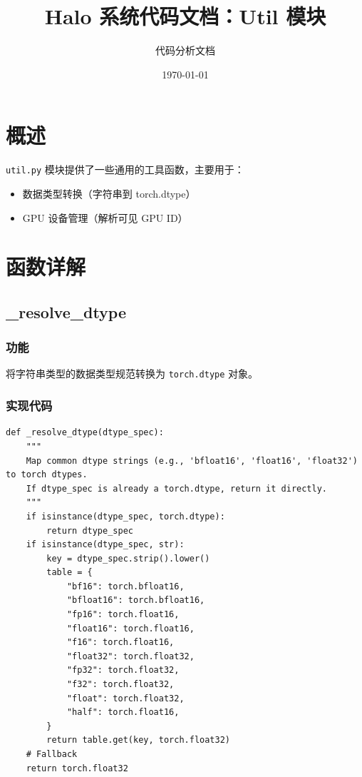 \documentclass[12pt,a4paper]{article}
\title{Halo 系统代码文档：Util 模块}
\author{代码分析文档}
\date{\today}
\begin{document}
\maketitle

\tableofcontents
\newpage

\section{概述}

\texttt{util.py} 模块提供了一些通用的工具函数，主要用于：
\begin{itemize}
    \item 数据类型转换（字符串到 torch.dtype）
    \item GPU 设备管理（解析可见 GPU ID）
\end{itemize}

\section{函数详解}

\subsection{\_resolve\_dtype}

\subsubsection{功能}

将字符串类型的数据类型规范转换为 \texttt{torch.dtype} 对象。

\subsubsection{实现代码}

\begin{lstlisting}
def _resolve_dtype(dtype_spec):
    """
    Map common dtype strings (e.g., 'bfloat16', 'float16', 'float32') to torch dtypes.
    If dtype_spec is already a torch.dtype, return it directly.
    """
    if isinstance(dtype_spec, torch.dtype):
        return dtype_spec
    if isinstance(dtype_spec, str):
        key = dtype_spec.strip().lower()
        table = {
            "bf16": torch.bfloat16,
            "bfloat16": torch.bfloat16,
            "fp16": torch.float16,
            "float16": torch.float16,
            "f16": torch.float16,
            "float32": torch.float32,
            "fp32": torch.float32,
            "f32": torch.float32,
            "float": torch.float32,
            "half": torch.float16,
        }
        return table.get(key, torch.float32)
    # Fallback
    return torch.float32
\end{lstlisting}
\end{document}
